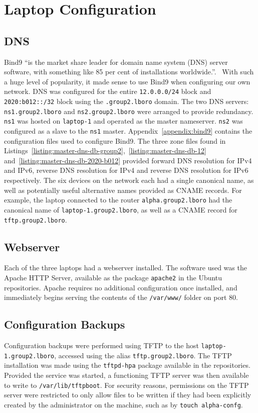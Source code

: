 \chapter{Laptop Configuration}
\section{DNS}
    Bind9 ``is the market share leader for domain name system (DNS) server software,
    with something like 85 per cent of installations worldwide.''.~\cite{Mohan2010}
    With such a huge level of popularity, it made sense to use Bind9 when configuring
    our own network. DNS was configured for the entire \texttt{12.0.0.0/24} block and \texttt
    {2020:b012::/32} block using the \texttt{.group2.lboro} domain. The two DNS
    servers: \texttt{ns1.group2.lboro} and \texttt{ns2.group2.lboro} were
    arranged to provide redundancy.
    \texttt{ns1} was hosted on \texttt{laptop-1} and operated as the master
    nameserver. \texttt{ns2} was configured as a slave to the \texttt{ns1}
    master. Appendix~\ref{appendix:bind9} contains the configuration files used
    to configure Bind9. The three zone files found in
    Listings~\ref {listing:master-dns-db-group2},~\ref{listing:master-dns-db-12} and~\ref {listing:master-dns-db-2020-b012} provided forward DNS
    resolution for IPv4 and IPv6, reverse DNS resolution for IPv4 and reverse
    DNS resolution for IPv6 respectively. The six devices on the network each
    had a single canonical name, as well as potentially useful alternative
    names provided as CNAME records. For example, the laptop connected to the
    router \texttt{alpha.group2.lboro} had the canonical name of
    \texttt{laptop-1.group2.lboro}, as well as a CNAME record for
    \texttt{tftp.group2.lboro}.
\section{Webserver}
    Each of the three laptops had a webserver installed. The software used was
    the Apache HTTP Server, available as the package \texttt{apache2} in the
    Ubuntu repositories. Apache requires no additional configuration once
    installed, and immediately begins serving the contents of the \texttt
    {/var/www/} folder on port 80.
\section{Configuration Backups}
    Configuration backups were performed using TFTP to the host \texttt
    {laptop-1.group2.lboro}, accessed using the alias \texttt
    {tftp.group2.lboro}. The TFTP installation was made using the \texttt
    {tftpd-hpa} package available in the repositories. Provided the service was
    started, a functioning TFTP server was then available to write to \texttt
    {/var/lib/tftpboot}. For security reasons, permissions on the TFTP server
    were restricted to only allow files to be written if they had been
    explicitly created by the administrator on the machine, such as by
    \texttt{touch alpha-confg}.
